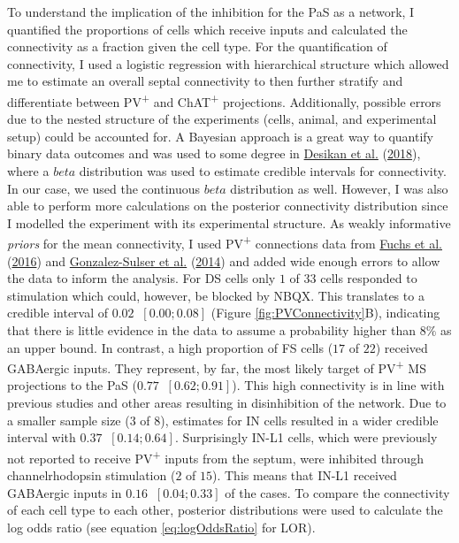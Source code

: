 \documentclass[
  12pt,
  a4paper,
  openany]{book}
\begin{document}
To understand the implication of the inhibition for the PaS as a network, I quantified the proportions of cells which receive inputs and calculated the connectivity as a fraction given the cell type. For the quantification of connectivity, I used a logistic regression with hierarchical structure which allowed me to estimate an overall septal connectivity to then further stratify and differentiate between PV\textsuperscript{+} and ChAT\textsuperscript{+} projections. Additionally, possible errors due to the nested structure of the experiments (cells, animal, and experimental setup) could be accounted for. A Bayesian approach is a great way to quantify binary data outcomes and was used to some degree in \protect\hyperlink{ref-desikan_target_2018}{Desikan et al.} (\protect\hyperlink{ref-desikan_target_2018}{2018}), where a \(beta\) distribution was used to estimate credible intervals for connectivity. In our case, we used the continuous \(beta\) distribution as well. However, I was also able to perform more calculations on the posterior connectivity distribution since I modelled the experiment with its experimental structure. As weakly informative \emph{priors} for the mean connectivity, I used PV\textsuperscript{+} connections data from \protect\hyperlink{ref-fuchs_local_2016}{Fuchs et al.} (\protect\hyperlink{ref-fuchs_local_2016}{2016}) and \protect\hyperlink{ref-gonzalez-sulser_gabaergic_2014}{Gonzalez-Sulser et al.} (\protect\hyperlink{ref-gonzalez-sulser_gabaergic_2014}{2014}) and added wide enough errors to allow the data to inform the analysis. For DS cells only \(1\) of \(33\) cells responded to stimulation which could, however, be blocked by NBQX. This translates to a credible interval of \(0.02\ \) \([0.00; 0.08]\) (Figure \ref{fig:PVConnectivity}B), indicating that there is little evidence in the data to assume a probability higher than \(8\%\) as an upper bound. In contrast, a high proportion of FS cells (\(17\) of \(22\)) received GABAergic inputs. They represent, by far, the most likely target of PV\textsuperscript{+} MS projections to the PaS (\(0.77\ \) \([0.62; 0.91]\)). This high connectivity is in line with previous studies and other areas resulting in disinhibition of the network. Due to a smaller sample size (\(3\) of \(8\)), estimates for IN cells resulted in a wider credible interval with \(0.37\ \) \([0.14; 0.64]\). Surprisingly IN-L1 cells, which were previously not reported to receive PV\textsuperscript{+} inputs from the septum, were inhibited through channelrhodopsin stimulation (\(2\) of \(15\)). This means that IN-L1 received GABAergic inputs in \(0.16\ \) \([0.04; 0.33]\) of the cases. To compare the connectivity of each cell type to each other, posterior distributions were used to calculate the log odds ratio (see equation \eqref{eq:logOddsRatio} for LOR).
\end{document}
